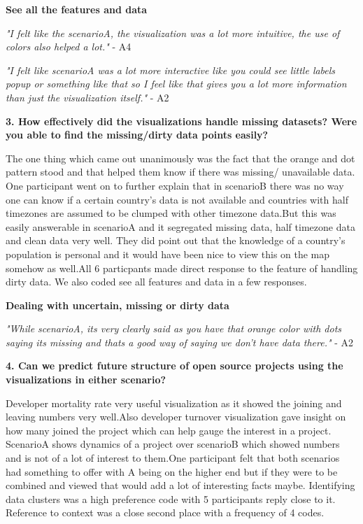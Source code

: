 \documentclass[seploa]{beavtex}
\begin{document}
\textbf{See all the features and data}

{\em "I felt like the scenarioA, the visualization was a lot more intuitive, the use of colors also helped a lot."} - A4

{\em "I felt like scenarioA was a lot more interactive like you could see little labels popup or something like that so I feel like that gives you a lot more information than just the visualization itself."} - A2

\textbf{3. How effectively did the visualizations handle missing datasets? Were you able to find the missing/dirty data points easily?}

The one thing which came out unanimously was the fact that the orange and dot pattern stood and that helped them know if there was missing/ unavailable data. One participant went on to further explain that in scenarioB there was no way one can know if a certain country's data is not available and countries with half timezones are assumed to be clumped with other timezone data.But this was easily answerable in scenarioA and it segregated missing data, half timezone data and clean data very well. They did point out that the knowledge of a country's population is personal and it would have been nice to view this on the map somehow as well.All 6 particpants made direct response to the feature of handling dirty data. We also coded see all features and data in a few responses.

\textbf{Dealing with uncertain, missing or dirty data}

{\em "While scenarioA, its very clearly said as you have that orange color with dots saying its missing and thats a good way of saying we don't have data there."} - A2

\textbf{4. Can we predict future structure of open source projects using the visualizations in either scenario?}

Developer mortality rate very useful visualization as it showed the joining and leaving numbers very well.Also developer turnover visualization gave insight on how many joined the project which can help gauge the interest in a project. ScenarioA shows dynamics of a project over scenarioB which showed numbers and is not of a lot of interest to them.One participant felt that both scenarios had something to offer with A being on the higher end but if they were to be combined and viewed that would add a lot of interesting facts maybe. Identifying data clusters was a high preference code with 5 participants reply close to it. Reference to context was a close second place with a frequency of 4 codes.
\end{document}

